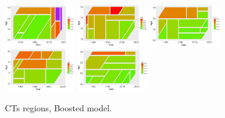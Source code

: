 \documentclass[fleqn,10pt]{wlscirep}
\begin{document}
\begin{figure}[H]
{\includegraphics[width=0.27\textwidth]{gbm_61_b.jpeg}}
{\includegraphics[width=0.27\textwidth]{xgbm_b.jpeg}}
{\includegraphics[width=0.27\textwidth]{xgbm_61_b.jpeg}}
{\includegraphics[width=0.27\textwidth]{xgbm_preproc_b.jpeg}}
{\includegraphics[width=0.27\textwidth]{xgbm_preproc_61_b.jpeg}}
\caption{CTs regions, Boosted model.}
\label{fig:CT2}
\end{figure}
\end{document}
